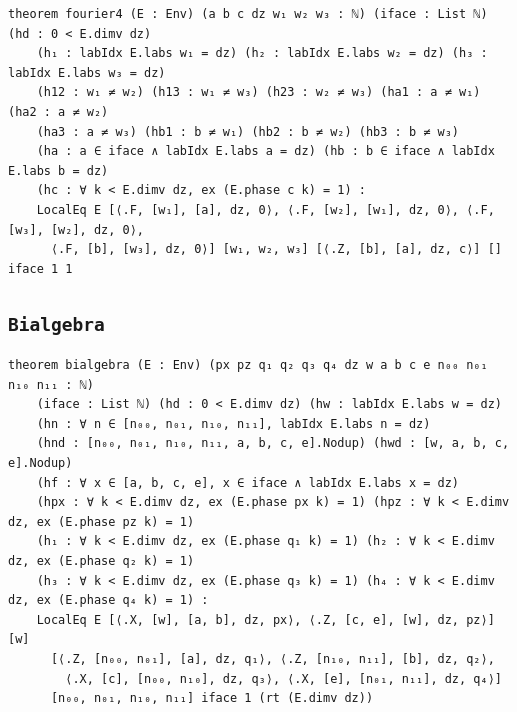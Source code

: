\begin{lstlisting}[style=leancore]
theorem fourier4 (E : Env) (a b c dz w₁ w₂ w₃ : ℕ) (iface : List ℕ) (hd : 0 < E.dimv dz)
    (h₁ : labIdx E.labs w₁ = dz) (h₂ : labIdx E.labs w₂ = dz) (h₃ : labIdx E.labs w₃ = dz)
    (h12 : w₁ ≠ w₂) (h13 : w₁ ≠ w₃) (h23 : w₂ ≠ w₃) (ha1 : a ≠ w₁) (ha2 : a ≠ w₂)
    (ha3 : a ≠ w₃) (hb1 : b ≠ w₁) (hb2 : b ≠ w₂) (hb3 : b ≠ w₃)
    (ha : a ∈ iface ∧ labIdx E.labs a = dz) (hb : b ∈ iface ∧ labIdx E.labs b = dz)
    (hc : ∀ k < E.dimv dz, ex (E.phase c k) = 1) :
    LocalEq E [⟨.F, [w₁], [a], dz, 0⟩, ⟨.F, [w₂], [w₁], dz, 0⟩, ⟨.F, [w₃], [w₂], dz, 0⟩,
      ⟨.F, [b], [w₃], dz, 0⟩] [w₁, w₂, w₃] [⟨.Z, [b], [a], dz, c⟩] [] iface 1 1
\end{lstlisting}

\subsection{\texttt{Bialgebra}}
\begin{lstlisting}[style=leancore]
theorem bialgebra (E : Env) (px pz q₁ q₂ q₃ q₄ dz w a b c e n₀₀ n₀₁ n₁₀ n₁₁ : ℕ)
    (iface : List ℕ) (hd : 0 < E.dimv dz) (hw : labIdx E.labs w = dz)
    (hn : ∀ n ∈ [n₀₀, n₀₁, n₁₀, n₁₁], labIdx E.labs n = dz)
    (hnd : [n₀₀, n₀₁, n₁₀, n₁₁, a, b, c, e].Nodup) (hwd : [w, a, b, c, e].Nodup)
    (hf : ∀ x ∈ [a, b, c, e], x ∈ iface ∧ labIdx E.labs x = dz)
    (hpx : ∀ k < E.dimv dz, ex (E.phase px k) = 1) (hpz : ∀ k < E.dimv dz, ex (E.phase pz k) = 1)
    (h₁ : ∀ k < E.dimv dz, ex (E.phase q₁ k) = 1) (h₂ : ∀ k < E.dimv dz, ex (E.phase q₂ k) = 1)
    (h₃ : ∀ k < E.dimv dz, ex (E.phase q₃ k) = 1) (h₄ : ∀ k < E.dimv dz, ex (E.phase q₄ k) = 1) :
    LocalEq E [⟨.X, [w], [a, b], dz, px⟩, ⟨.Z, [c, e], [w], dz, pz⟩] [w]
      [⟨.Z, [n₀₀, n₀₁], [a], dz, q₁⟩, ⟨.Z, [n₁₀, n₁₁], [b], dz, q₂⟩,
        ⟨.X, [c], [n₀₀, n₁₀], dz, q₃⟩, ⟨.X, [e], [n₀₁, n₁₁], dz, q₄⟩]
      [n₀₀, n₀₁, n₁₀, n₁₁] iface 1 (rt (E.dimv dz))
\end{lstlisting}

